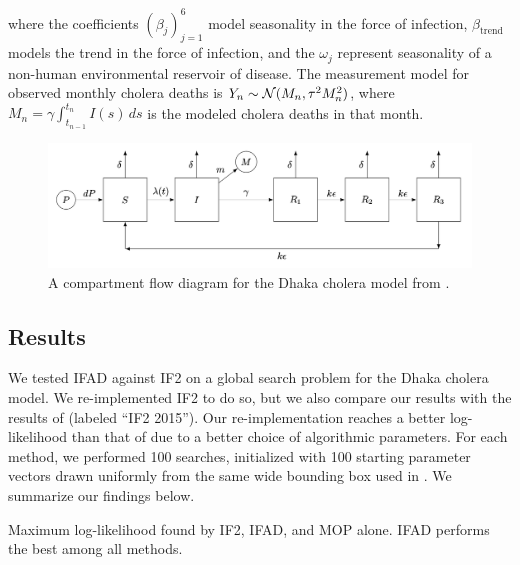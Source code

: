 \documentclass[numsec,webpdf,modern,medium,namedate]{oup-authoring-template}
\newcommand\arxiv[2]{#2} %
\theoremstyle{thmstyleone}%
\theoremstyle{thmstyletwo}%
\theoremstyle{thmstylethree}%
\begin{document}
where the coefficients $(\beta_j)_{j=1}^6$ model seasonality in the force of infection, $\beta_{\text{trend}}$ models the trend in the force of infection, and the $\omega_j$ represent seasonality of a non-human environmental reservoir of disease.
The measurement model for observed monthly cholera deaths is
    $Y_n \sim {\mathcal{N}}(M_n, \tau^2M_n^2)$,
where $M_n=\gamma\int_{t_{n-1}}^{t_n}I(s)\, ds$ is the modeled cholera deaths in that month.


\begin{figure}
    \centering
    \includegraphics[width=\arxiv{14cm}{\textwidth}]{imgs/095/tikzcholera.png}
    \vspace*{-7mm}
    \caption{A compartment flow diagram for the Dhaka cholera model from \cite{king08}.}
    \label{fig:tikz-cholera}
    \arxiv{}{\vspace*{-3mm}}
\end{figure}

\arxiv{}{\vspace*{-2mm}}
\subsection{Results}

We tested IFAD against IF2 on a global search problem for the Dhaka cholera model.
We re-implemented IF2 to do so, but we also compare our results with the results of \cite{ionides15} (labeled ``IF2 2015'').
Our re-implementation reaches a better log-likelihood than that of \cite{ionides15} due to a better choice of algorithmic parameters.
For each method, we performed 100 searches, initialized with 100 starting parameter vectors drawn uniformly from the same wide bounding box used in \cite{ionides15}. We summarize our findings below. 

  
\arxiv{}{\vspace*{-1mm}}
\begin{table}[htbp!]
\centering

\caption{Maximum log-likelihood found by IF2, IFAD, and MOP alone. IFAD performs the best among all methods.}
\arxiv{}{\vspace*{-7mm}}
\label{table:mle}
\end{table}
\end{document}
